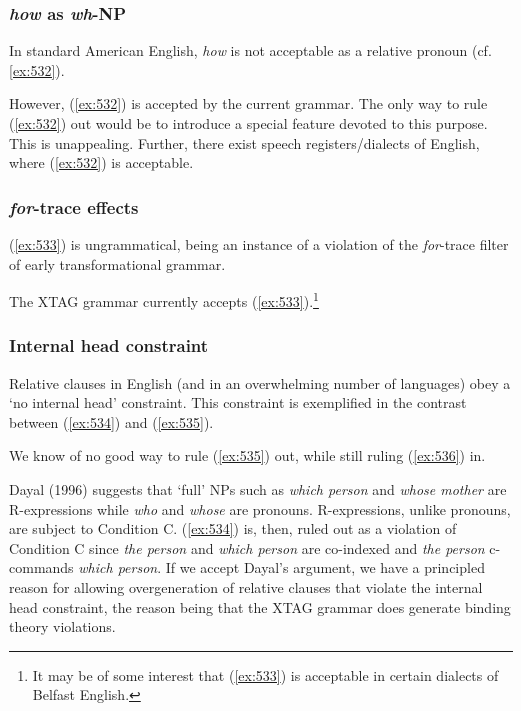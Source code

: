 \subsubsection{{\em how} as {\em wh}-NP} 
In standard American English, {\em how} is not acceptable as a 
relative pronoun (cf. \ref{ex:532}). 
 
\beginsentences
{}\label{ex:532} 
\endsentences

 
However, (\ref{ex:532}) is accepted by the current grammar. 
The only way to rule (\ref{ex:532}) out would be to introduce a special feature 
devoted to this purpose. This is unappealing. Further, there exist 
speech registers/dialects of English, where (\ref{ex:532}) is acceptable. 
 
\subsubsection{{\em for}-trace effects} 
(\ref{ex:533}) is ungrammatical, being an instance of a violation of the 
{\em for}-trace filter of early transformational grammar. 
 
\beginsentences
{}\label{ex:533} 
\endsentences

 
The XTAG grammar currently accepts (\ref{ex:533}).\footnote{It may be of some interest that (\ref{ex:533}) is acceptable in certain dialects of Belfast English.} 
 
 
\subsubsection{Internal head constraint} 
Relative clauses in English (and in an overwhelming number of languages) 
obey a `no internal head' constraint. This constraint is exemplified in 
the contrast between (\ref{ex:534}) and (\ref{ex:535}). 
 
\beginsentences
{}\label{ex:534} 
\label{ex:535} 
\endsentences

 
We know of no good way to rule (\ref{ex:535}) out, while still ruling (\ref{ex:536}) in. 
\beginsentences
{}\label{ex:536} 
\endsentences

 
Dayal (1996) suggests that `full' NPs such as {\em which person} and 
{\em whose mother} are R-expressions while {\em who} and {\em whose} 
are pronouns. R-expressions, unlike pronouns, are subject to Condition C. 
(\ref{ex:534}) is, then, ruled out as a violation of Condition C since {\em the person} and {\em which person} are co-indexed and {\em the person} 
c-commands {\em which person}. If we accept Dayal's argument, we 
have a principled reason for allowing overgeneration of relative clauses 
that violate the internal head constraint, the reason being that 
the XTAG grammar does generate binding theory violations. 
 
